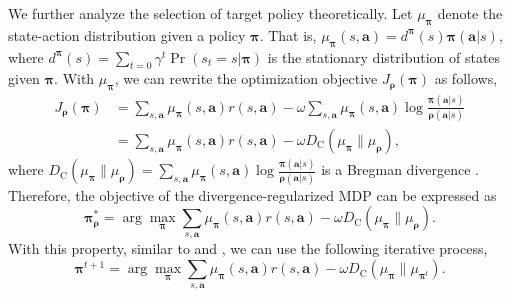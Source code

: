 \documentclass{article}
\begin{document}
We further analyze the selection of target policy theoretically. Let $\mu_{\bm{\pi}}$ denote the state-action distribution given a policy $\bm{\pi}$. That is, $\mu_{\bm{\pi}}(s,\bm{a}) = d^{\bm{\pi}}(s) {\bm{\pi}}(\bm{a}|s )$, where $d^{\bm{\pi}}(s) = \sum_{t = 0} \gamma^t \operatorname{Pr}(s_t = s| {\bm{\pi}})$ is the stationary distribution of states given ${\bm{\pi}}$. 
With $\mu_{\bm{\pi}}$, we can rewrite the optimization objective $J_{\bm{\rho}}({\bm{\pi}})$ as follows,
\begin{align}
	J_{\bm{\rho}}({\bm{\pi}}) & = \sum_{s,\bm{a}} \mu_{\bm{\pi}}(s,\bm{a}) r(s,\bm{a}) - \omega \sum_{s,\bm{a}} \mu_{\bm{\pi}}(s,\bm{a}) \log \frac{{\bm{\pi}}(\bm{a}|s)}{{\bm{\rho}}(\bm{a}|s)} \nonumber \\
	& = \sum_{s,\bm{a}} \mu_{\bm{\pi}}(s,\bm{a}) r(s,\bm{a}) - \omega D_{\operatorname{C}} \left( \mu_{\bm{\pi}} \| \mu_{\bm{\rho}} \right), \label{alter-J}
\end{align} 
where $D_{\operatorname{C}} \left( \mu_{\bm{\pi}} \| \mu_{\bm{\rho}} \right) = \sum_{s,\bm{a}} \mu_{\bm{\pi}}(s,\bm{a}) \log \frac{{\bm{\pi}}(\bm{a}|s)}{{\bm{\rho}}(\bm{a}|s)}$ is a Bregman divergence \citep{unifiedview}. Therefore, the objective of the divergence-regularized MDP can be expressed as 
\begin{equation} \label{MD-process}
	{\bm{\pi}}_{\bm{\rho}}^* = \arg \max_{{\bm{\pi}}} \sum_{s,\bm{a}} \mu_{\bm{\pi}}(s,\bm{a}) r(s,\bm{a}) - \omega D_{\operatorname{C}} \left( \mu_{\bm{\pi}} \| \mu_{\bm{\rho}} \right).
\end{equation}
With this property, similar to \citet{unifiedview} and \citet{DIV-AUG}, we can use the following iterative process,
\begin{equation}
	\label{mirror}
	\bm{\pi}^{t+1} = \arg \max_{{\bm{\pi}}} \sum_{s,\bm{a}} \mu_{\bm{\pi}}(s,\bm{a}) r(s,\bm{a})  - \omega D_{\operatorname{C}} \left( \mu_{\bm{\pi}} \| \mu_{{\bm{\pi}}^t} \right). 
\end{equation}
\end{document}
